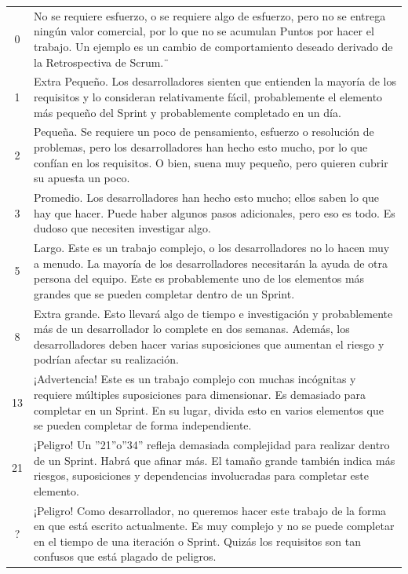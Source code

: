 \documentclass[
11pt, %
]{charter}
\begin{document}
\begin{table}[H]
\centering
 \begin{tabular}{|c|p{14cm}|} 
\hline
\rowcolor[HTML]{C0C0C0} 
\multicolumn {2}{|c|}{\textbf{Fibonacci Práctico}}  	\\ \hline
0  & No se requiere esfuerzo, o se requiere algo de esfuerzo, pero no se entrega ningún valor comercial, por lo que no se acumulan Puntos por hacer el trabajo. Un ejemplo es un cambio de comportamiento deseado derivado de la Retrospectiva de Scrum.¨ \\ \hline
1  & Extra Pequeño. Los desarrolladores sienten que entienden la mayoría de los requisitos y lo consideran relativamente fácil, probablemente el elemento más pequeño del Sprint y probablemente completado en un día. \\ \hline
2  & Pequeña. Se requiere un poco de pensamiento, esfuerzo o resolución de problemas, pero los desarrolladores han hecho esto mucho, por lo que confían en los requisitos. O bien, suena muy pequeño, pero quieren cubrir su apuesta un poco.  \\ \hline
3  & Promedio. Los desarrolladores han hecho esto mucho; ellos saben lo que hay que hacer. Puede haber algunos pasos adicionales, pero eso es todo. Es dudoso que necesiten investigar algo. \\ \hline
5  & Largo. Este es un trabajo complejo, o los desarrolladores no lo hacen muy a menudo. La mayoría de los desarrolladores necesitarán la ayuda de otra persona del equipo. Este es probablemente uno de los elementos más grandes que se pueden completar dentro de un Sprint. \\ \hline
8  & Extra grande. Esto llevará algo de tiempo e investigación y probablemente más de un desarrollador lo complete en dos semanas. Además, los desarrolladores deben hacer varias suposiciones que aumentan el riesgo y podrían afectar su realización. \\ \hline
13  & ¡Advertencia!  Este es un trabajo complejo con muchas incógnitas y requiere múltiples suposiciones para dimensionar. Es demasiado para completar en un Sprint. En su lugar, divida esto en varios elementos que se pueden completar de forma independiente. \\ \hline
21  & ¡Peligro!  Un ''21''o''34'' refleja demasiada complejidad para realizar dentro de un Sprint. Habrá que afinar más. El tamaño grande también indica más riesgos, suposiciones y dependencias involucradas para completar este elemento.\\ \hline
?   & ¡Peligro! Como desarrollador, no queremos hacer este trabajo de la forma en que está escrito actualmente. Es muy complejo y no se puede completar en el tiempo de una iteración o Sprint. Quizás los requisitos son tan confusos que está plagado de peligros.\\ \hline
\end{tabular}
\end{table}
\end{document}
